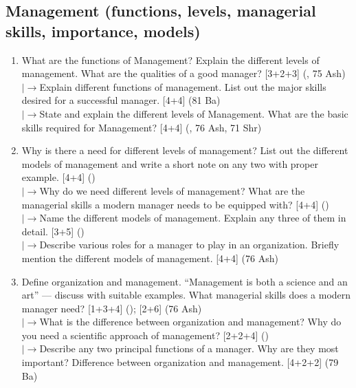 \documentclass[12pt]{article}
\newcommand{\lb}{\\$\left|\rightarrow\right.$}
\begin{document}
  \subsection{Management (functions, levels, managerial skills, importance, models)}
    \begin{enumerate}[topsep=0pt, noitemsep]
      \item What are the functions of Management? Explain the different levels of management. What are the qualities of a good manager? \hfill [3+2+3] (, 75 Ash)
        \lb Explain different functions of management. List out the major skills desired for a successful manager. \hfill [4+4] (81 Ba)
        \lb State and explain the different levels of Management. What are the basic skills required for Management? \hfill [4+4] (, 76 Ash, 71 Shr)

      \item Why is there a need for different levels of management? List out the different models of management and write a short note on any two with proper example. \hfill [4+4] ()
        \lb Why do we need different levels of management? What are the managerial skills a modern manager needs to be equipped with? \hfill [4+4] ()
        \lb Name the different models of management. Explain any three of them in detail. \hfill [3+5] ()
        \lb Describe various roles for a manager to play in an organization. Briefly mention the different models of management. \hfill [4+4] (76 Ash)

      \item Define organization and management. ``Management is both a science and an art'' --- discuss with suitable examples. What managerial skills does a modern manager need? \hfill [1+3+4] (); [2+6] (76 Ash)
        \lb What is the difference between organization and management? Why do you need a scientific approach of management? \hfill [2+2+4] ()
        \lb Describe any two principal functions of a manager. Why are they most important? Difference between organization and management. \hfill [4+2+2] (79 Ba)
    \end{enumerate}
\end{document}
